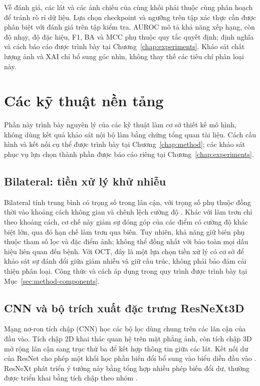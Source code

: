 \documentclass[14pt,a4paper,oneside]{extreport}
\begin{document}
Về đánh giá, các lát và các ảnh chiếu của cùng khối phải thuộc cùng
phân hoạch để tránh rò rỉ dữ liệu. Lựa chọn checkpoint và ngưỡng trên
tập xác thực cần được phân biệt với đánh giá trên tập kiểm tra.
AUROC mô tả khả năng xếp hạng, còn độ nhạy, độ đặc hiệu, F1, BA và MCC
phụ thuộc quy tắc quyết định; định nghĩa và cách báo cáo được trình bày
tại Chương~\ref{chap:experiments}. Khảo sát chất lượng ảnh và XAI chỉ
bổ sung góc nhìn, không thay thế các tiêu chí phân loại này.

\section{Các kỹ thuật nền tảng}
\label{sec:component-rationale}
Phần này trình bày nguyên lý của các kỹ thuật làm cơ sở thiết kế mô
hình, không dùng kết quả khảo sát nội bộ làm bằng chứng tổng quan tài
liệu. Cách cấu hình và kết nối cụ thể được trình bày tại
Chương~\ref{chap:method}; các khảo sát phục vụ lựa chọn thành phần được
báo cáo riêng tại Chương~\ref{chap:experiments}.

\subsection{Bilateral: tiền xử lý khử nhiễu}
Bilateral tính trung bình có trọng số trong lân cận, với trọng số phụ
thuộc đồng thời vào khoảng cách không gian và chênh lệch cường độ
\cite{tomasi1998bilateral}. Khác với làm trơn chỉ theo khoảng cách,
cơ chế này giảm sự đóng góp của các điểm có cường độ khác biệt lớn,
qua đó hạn chế làm trơn qua biên. Tuy nhiên, khả năng giữ biên phụ
thuộc tham số lọc và đặc điểm ảnh; không thể đồng nhất với bảo toàn
mọi dấu hiệu liên quan đến bệnh. Với OCT, đây là một lựa chọn tiền
xử lý có cơ sở để khảo sát sự đánh đổi giữa giảm nhiễu và giữ cấu trúc,
không phải bảo đảm cải thiện phân loại. Công thức và cách áp dụng trong
quy trình được trình bày tại Mục~\ref{sec:method-components}.

\subsection{CNN và bộ trích xuất đặc trưng ResNeXt3D}
Mạng nơ-ron tích chập (CNN) học các bộ lọc dùng chung trên các lân cận
của đầu vào. Tích chập 2D khai thác quan hệ trên mặt phẳng ảnh, còn
tích chập 3D mở rộng lân cận sang trục thứ ba để kết hợp thông tin giữa
các lát. Kết nối dư của ResNet cho phép một khối học phần biến đổi
bổ sung vào biểu diễn đầu vào \cite{he2016resnet}. ResNeXt phát triển
ý tưởng này bằng tổng hợp nhiều phép biến đổi dư, thường được triển
khai bằng tích chập theo nhóm \cite{xie2017resnext}.
\end{document}
